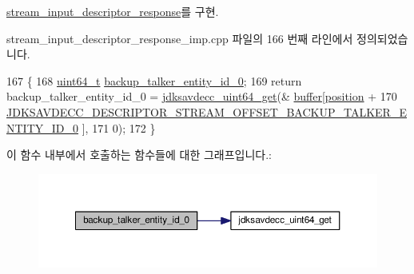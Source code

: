 \hyperlink{classavdecc__lib_1_1stream__input__descriptor__response_acd4fa01e575dfb7160afc66a7cdffcc6}{stream\+\_\+input\+\_\+descriptor\+\_\+response}를 구현.



stream\+\_\+input\+\_\+descriptor\+\_\+response\+\_\+imp.\+cpp 파일의 166 번째 라인에서 정의되었습니다.


\begin{DoxyCode}
167 \{
168     \hyperlink{parse_8c_aec6fcb673ff035718c238c8c9d544c47}{uint64\_t} \hyperlink{classavdecc__lib_1_1stream__input__descriptor__response__imp_a7069339e1e712c1ffb3f7627c6e731fc}{backup\_talker\_entity\_id\_0};
169     \textcolor{keywordflow}{return} backup\_talker\_entity\_id\_0 = \hyperlink{group__endian_gac8c2b48b7d7db101708e0197e366ac42}{jdksavdecc\_uint64\_get}(&
      \hyperlink{classavdecc__lib_1_1descriptor__response__base__imp_a56ed84df35de10bdb65e72b184309497}{buffer}[\hyperlink{classavdecc__lib_1_1descriptor__response__base__imp_a7a04afe5347934be732ec70a70bd0a28}{position} +
170                                                                      
      \hyperlink{group__descriptor__stream_ga342f66f404f730f15c65bc78b1ec0f4c}{JDKSAVDECC\_DESCRIPTOR\_STREAM\_OFFSET\_BACKUP\_TALKER\_ENTITY\_ID\_0}
      ],
171                                                              0);
172 \}
\end{DoxyCode}


이 함수 내부에서 호출하는 함수들에 대한 그래프입니다.\+:
\nopagebreak
\begin{figure}[H]
\begin{center}
\leavevmode
\includegraphics[width=350pt]{classavdecc__lib_1_1stream__input__descriptor__response__imp_a7069339e1e712c1ffb3f7627c6e731fc_cgraph}
\end{center}
\end{figure}


